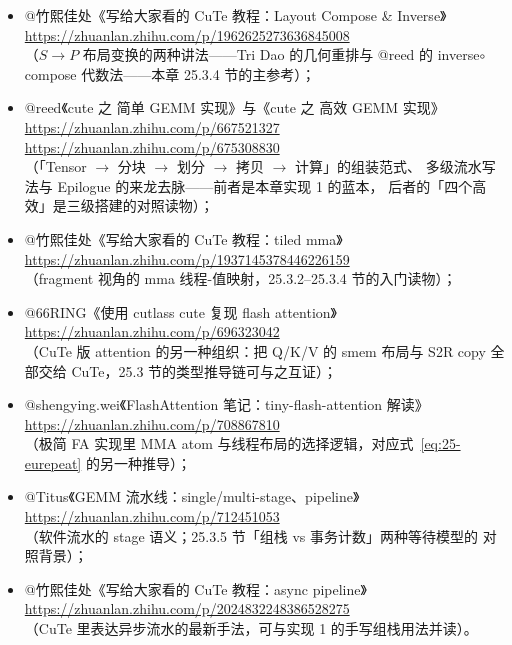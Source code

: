 \begin{itemize}
  \item @竹熙佳处《写给大家看的 CuTe 教程：Layout Compose \& Inverse》\\
        \url{https://zhuanlan.zhihu.com/p/1962625273636845008}\\
        （$S\to P$ 布局变换的两种讲法——Tri Dao 的几何重排与 @reed 的
        inverse$\circ$compose 代数法——本章 25.3.4 节的主参考）；
  \item @reed《cute 之 简单 GEMM 实现》与《cute 之 高效 GEMM 实现》\\
        \url{https://zhuanlan.zhihu.com/p/667521327}\\
        \url{https://zhuanlan.zhihu.com/p/675308830}\\
        （「Tensor $\to$ 分块 $\to$ 划分 $\to$ 拷贝 $\to$ 计算」的组装范式、
        多级流水写法与 Epilogue 的来龙去脉——前者是本章实现 1 的蓝本，
        后者的「四个高效」是三级搭建的对照读物）；
  \item @竹熙佳处《写给大家看的 CuTe 教程：tiled mma》\\
        \url{https://zhuanlan.zhihu.com/p/1937145378446226159}\\
        （fragment 视角的 mma 线程-值映射，25.3.2--25.3.4 节的入门读物）；
  \item @66RING《使用 cutlass cute 复现 flash attention》\\
        \url{https://zhuanlan.zhihu.com/p/696323042}\\
        （CuTe 版 attention 的另一种组织：把 Q/K/V 的 smem 布局与 S2R copy
        全部交给 CuTe，25.3 节的类型推导链可与之互证）；
  \item @shengying.wei《FlashAttention 笔记：tiny-flash-attention 解读》\\
        \url{https://zhuanlan.zhihu.com/p/708867810}\\
        （极简 FA 实现里 MMA atom 与线程布局的选择逻辑，对应式~\eqref{eq:25-eurepeat}
        的另一种推导）；
  \item @Titus《GEMM 流水线：single/multi-stage、pipeline》\\
        \url{https://zhuanlan.zhihu.com/p/712451053}\\
        （软件流水的 stage 语义；25.3.5 节「组栈 vs 事务计数」两种等待模型的
        对照背景）；
  \item @竹熙佳处《写给大家看的 CuTe 教程：async pipeline》\\
        \url{https://zhuanlan.zhihu.com/p/2024832248386528275}\\
        （CuTe 里表达异步流水的最新手法，可与实现 1 的手写组栈用法并读）。
\end{itemize}
